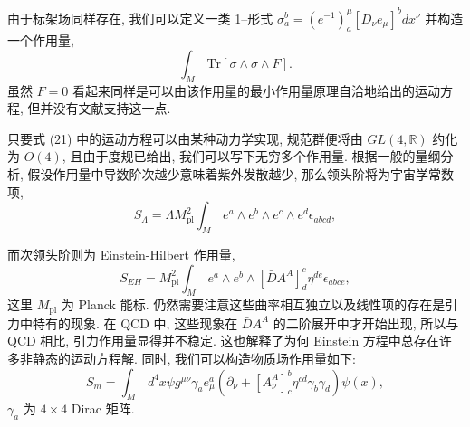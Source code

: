 \documentclass{article}
\begin{document}
由于标架场同样存在, 我们可以定义一类 1--形式 $\sigma_{a}^{b}=(e^{-1})_{a}^{\mu}[D_{\nu}e_{\mu}]^{b}dx^{\nu}$ 并构造一个作用量,
\begin{equation}
\int_{M}\,\textrm{Tr}[\sigma\wedge\sigma\wedge F].
\end{equation}
虽然 $F=0$ 看起来同样是可以由该作用量的最小作用量原理自洽地给出的运动方程, 但并没有文献支持这一点.

只要式 (21) 中的运动方程可以由某种动力学实现, 规范群便将由 $GL(4, \mathbb{R})$ 约化为 $O(4)$, 且由于度规已给出, 我们可以写下无穷多个作用量. 根据一般的量纲分析, 假设作用量中导数阶次越少意味着紫外发散越少, 那么领头阶将为宇宙学常数项,
\begin{equation}
S_{\Lambda}=\Lambda M^{2}_{\textrm{pl}}\int_{M}\,e^{a}\wedge e^{b} \wedge e^{c} \wedge e^{d} \epsilon_{abcd},
\end{equation}

而次领头阶则为 Einstein-Hilbert 作用量,
\begin{equation}
S_{EH}=M^{2}_{\textrm{pl}}\int_{M}\,e^{a}\wedge e^{b} \wedge [\bar{D}A^{A}]_{d}^{c} \eta^{de}\epsilon_{abce},
\end{equation}
这里 $M_{\textrm{pl}}$ 为 Planck 能标. 仍然需要注意这些曲率相互独立以及线性项的存在是引力中特有的现象. 在 QCD 中, 这些现象在 $\bar{D}A^{A}$ 的二阶展开中才开始出现, 所以与 QCD 相比, 引力作用量显得并不稳定. 这也解释了为何 Einstein 方程中总存在许多非静态的运动方程解. 同时, 我们可以构造物质场作用量如下:
\begin{equation}
S_{m}=\int_{M}\,d^{4}x\bar{\psi}g^{\mu\nu}\gamma_{a}e^{a}_{\mu}(\partial_{\nu}+[A_{\nu}^{A}]^{b}_{c}\eta^{cd}\gamma_{b}\gamma_{d})\psi(x),
\end{equation}
$\gamma_{a}$ 为 $4\times 4$ Dirac 矩阵.
\end{document}
